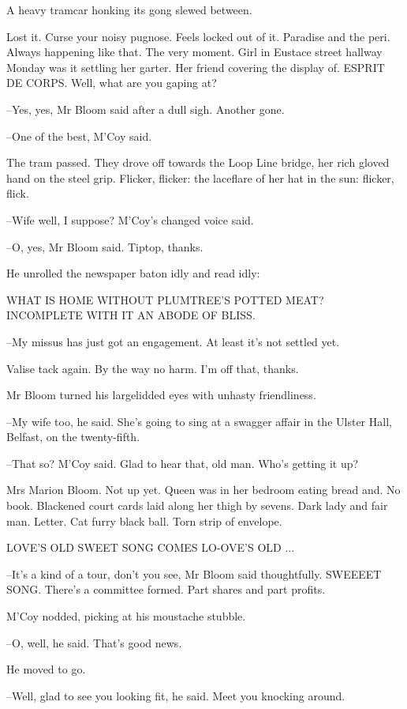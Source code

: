 A heavy tramcar honking its gong slewed between.

Lost it. Curse your noisy pugnose. Feels locked out of it. Paradise and
the peri. Always happening like that. The very moment. Girl in Eustace
street hallway Monday was it settling her garter. Her friend covering the
display of. ESPRIT DE CORPS. Well, what are you gaping at?

--Yes, yes, Mr Bloom said after a dull sigh. Another gone.

--One of the best, M'Coy said.

The tram passed. They drove off towards the Loop Line bridge, her rich
gloved hand on the steel grip. Flicker, flicker: the laceflare of her hat
in the sun: flicker, flick.

--Wife well, I suppose? M'Coy's changed voice said.

--O, yes, Mr Bloom said. Tiptop, thanks.

He unrolled the newspaper baton idly and read idly:


    WHAT IS HOME WITHOUT
    PLUMTREE'S POTTED MEAT?
    INCOMPLETE
    WITH IT AN ABODE OF BLISS.


--My missus has just got an engagement. At least it's not settled yet.

Valise tack again. By the way no harm. I'm off that, thanks.

Mr Bloom turned his largelidded eyes with unhasty friendliness.

--My wife too, he said. She's going to sing at a swagger affair in the
Ulster Hall, Belfast, on the twenty-fifth.

--That so? M'Coy said. Glad to hear that, old man. Who's getting it up?

Mrs Marion Bloom. Not up yet. Queen was in her bedroom eating bread and.
No book. Blackened court cards laid along her thigh by sevens. Dark lady
and fair man. Letter. Cat furry black ball. Torn strip of envelope.


    LOVE'S
    OLD
    SWEET
    SONG
    COMES LO-OVE'S OLD ...


--It's a kind of a tour, don't you see, Mr Bloom said thoughtfully.
SWEEEET SONG.  There's a committee formed. Part shares and part profits.

M'Coy nodded, picking at his moustache stubble.

--O, well, he said. That's good news.

He moved to go.

--Well, glad to see you looking fit, he said. Meet you knocking around.

